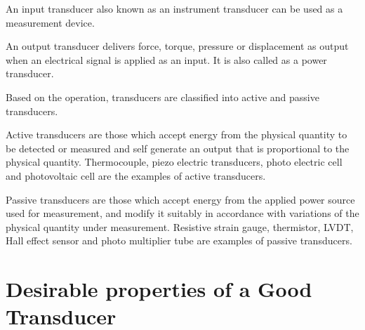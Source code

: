 An input transducer also known as an instrument transducer can be used as a measurement device.

An output transducer delivers force, torque, pressure or displacement as output when an electrical signal is applied as an input. It is also called as a power transducer.

\eject


Based on the operation, transducers are classified into active and passive transducers.

Active transducers are those which accept energy from the physical quantity to be detected or measured and self generate an output that is proportional to the physical quantity. Thermocouple, piezo electric transducers, photo electric cell and photovoltaic cell are the examples of active transducers.

Passive transducers are those which accept energy from the applied power source used for measurement, and modify it suitably in accordance with variations of the physical quantity under measurement. Resistive strain gauge, thermistor, LVDT, Hall effect sensor and photo multiplier tube are examples of passive transducers.

\section{Desirable properties of a Good Transducer}\label{sec8.4}

